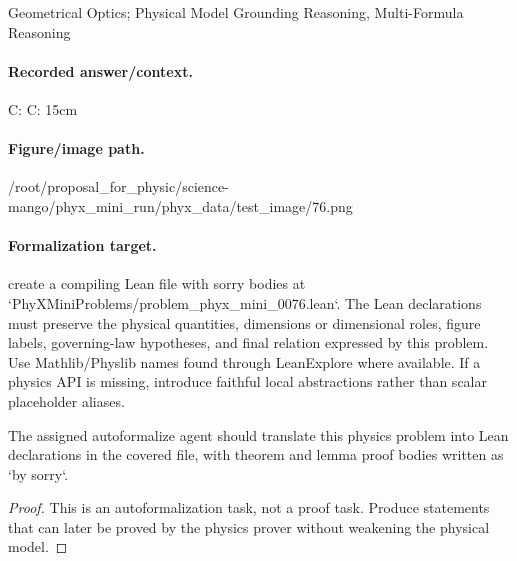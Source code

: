 Geometrical Optics; Physical Model Grounding Reasoning, Multi-Formula Reasoning

\paragraph{Recorded answer/context.}
C: C: 15cm

\paragraph{Figure/image path.}
/root/proposal\_for\_physic/science-mango/phyx\_mini\_run/phyx\_data/test\_image/76.png

\paragraph{Formalization target.}
create a compiling Lean file with sorry bodies at `PhyXMiniProblems/problem\_phyx\_mini\_0076.lean`. The Lean declarations must preserve the physical quantities, dimensions or dimensional roles, figure labels, governing-law hypotheses, and final relation expressed by this problem.
Use Mathlib/Physlib names found through LeanExplore where available. If a physics API is missing, introduce faithful local abstractions rather than scalar placeholder aliases.

\begin{theorem}
\label{thm:physics:phyx_mini_0076:target}
The assigned autoformalize agent should translate this physics problem into Lean declarations in the covered file, with theorem and lemma proof bodies written as `by sorry`.
\end{theorem}
\begin{proof}
This is an autoformalization task, not a proof task. Produce statements that can later be proved by the physics prover without weakening the physical model.
\end{proof}

